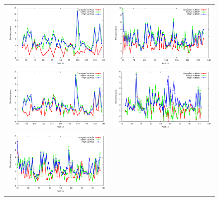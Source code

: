 \documentclass[a4paper,12pt]{article}
\begin{document}
   \begin{figure}[t]
     \centering
     \begin{tabular}{cc}
       \includegraphics[width=8.45cm]{images/1ABO_p4_similarity_bypos.pdf} &
       \includegraphics[width=8.45cm]{images/1BM2_p4_similarity_bypos.pdf} \\
       \includegraphics[width=8.45cm]{images/1CKA_p4_similarity_bypos.pdf} &
       \includegraphics[width=8.45cm]{images/1G9O_p4_similarity_bypos.pdf} \\
       \includegraphics[width=8.45cm]{images/1M61_p4_similarity_bypos.pdf} &

\end{tabular}
\end{figure}
\end{document}
